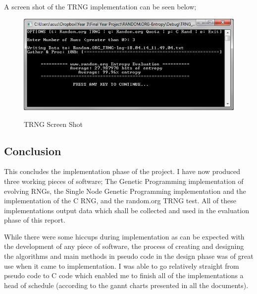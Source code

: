 \documentclass[a4paper,10.5pt]{article}
\begin{document}
A screen shot of the TRNG implementation can be seen below;

\begin{figure}[H]
\centering
\caption{TRNG Screen Shot}
\includegraphics[scale = 0.75]{trng-ss.png}
\label{sngpss}
\end{figure}


\subsection{Conclusion}
This concludes the implementation phase of the project. I have now produced three working pieces of software; The Genetic Programming implementation of evolving RNGs, the Single Node Genetic Programming implementation and the implementation of the C RNG, and the random.org TRNG test. All of these implementations output data which shall be collected and used in the evaluation phase of this report.

While there were some hiccups during implementation as can be expected with the development of any piece of software, the process of creating and designing the algorithms and main methods in pseudo code in the design phase was of great use when it came to implementation. I was able to go relatively straight from pseudo code to C code which enabled me to finish all of the implementations a head of schedule (according to the gannt charts presented in all the documents).
\end{document}
